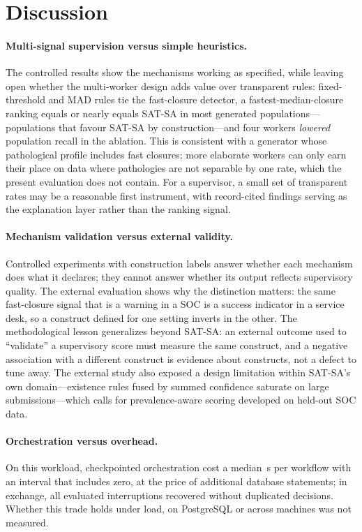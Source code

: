 \section{Discussion}
\label{sec:discussion}

\paragraph{Multi-signal supervision versus simple heuristics.} The controlled results
show the mechanisms working as specified, while leaving open whether the multi-worker
design adds value over transparent rules: fixed-threshold and MAD rules tie the
fast-closure detector, a fastest-median-closure ranking equals or nearly equals SAT-SA
in most generated populations---populations that favour SAT-SA by construction---and
four workers \emph{lowered} population recall in the ablation. This is consistent with
a generator whose pathological profile includes fast closures; more elaborate workers
can only earn their place on data where pathologies are not separable by one rate,
which the present evaluation does not contain. For a supervisor, a small set of transparent
rates may be a reasonable first instrument, with record-cited findings serving as the
explanation layer rather than the ranking signal.

\paragraph{Mechanism validation versus external validity.} Controlled experiments with
construction labels answer whether each mechanism does what it declares; they cannot
answer whether its output reflects supervisory quality. The external evaluation shows
why the distinction matters: the same fast-closure signal that is a warning in a SOC is
a success indicator in a service desk, so a construct defined for one setting inverts
in the other. The methodological lesson generalizes beyond SAT-SA: an external outcome
used to ``validate'' a supervisory score must measure the same construct, and a
negative association with a different construct is evidence about constructs, not a
defect to tune away. The external study also exposed a design limitation within SAT-SA's
own domain---existence rules fused by summed confidence saturate on large
submissions---which calls for prevalence-aware scoring developed on held-out SOC data.

\paragraph{Orchestration versus overhead.} On this workload, checkpointed orchestration
cost a median \,s per workflow with an interval that includes zero, at
the price of  additional database statements; in exchange, all evaluated
interruptions recovered without duplicated decisions. Whether this trade holds under
load, on PostgreSQL or across machines was not measured.

